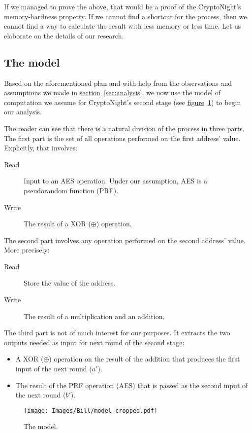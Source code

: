 If we managed to prove the above, that would be a proof of the CryptoNight's memory-hardness property. If we cannot find a shortcut for the process, then we cannot find a way to calculate the result with less memory or less time. Let us elaborate on the details of our research.

\subsection{The model}
Based on the aforementioned plan and with help from the observations and assumptions we made in \hyperref[sec:analysis]{section}~\ref{sec:analysis}, we now use the model of computation we assume for CryptoNight's second stage (see \hyperref[fig:model]{figure}~\ref{fig:model}) to begin our analysis.

The reader can see that there is a natural division of the process in three parts. The first part is the set of all operations performed on the first address' value. Explicitly, that involves:
\begin{description}
  \item [Read] Input to an AES operation. Under our assumption, AES is a pseudorandom function (PRF).
  \item [Write] The result of a XOR ($\oplus$) operation.
\end{description}

The second part involves any operation performed on the second address' value. More precisely:
\begin{description}
  \item [Read] Store the value of the address.
  \item [Write] The result of a multiplication and an addition.
\end{description}

The third part is not of much interest for our purposes. It extracts the two outputs needed as input for next round of the second stage:
\begin{itemize}
  \item A XOR ($\oplus$) operation on the result of the addition that produces the first input of the next round ($a'$).
  \item The result of the PRF operation (AES) that is passed as the second input of the next round ($b'$).
\end{itemize}
\clearpage

\begin{figure}[H]
  \centering
  \texttt{[image: Images/Bill/model\_cropped.pdf]}
  \caption{The model.~\cite{bill}}
  \label{fig:model}
\end{figure}


